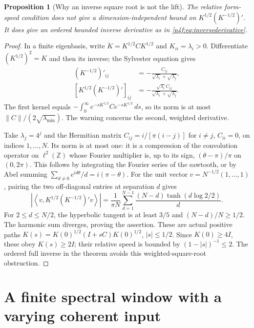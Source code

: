 \documentclass[11pt]{article}
\numberwithin{equation}{section}
\newtheorem{proposition}[theorem]{Proposition}
\theoremstyle{definition}
\theoremstyle{remark}
\begin{document}
\begin{proposition}[Why an inverse square root is not the lift]
\label{p4f:prop:sqrtwarning}
The relative form-speed condition does not give a
dimension-independent bound on
$K^{1/2}(K^{-1/2})'$. It does give an ordered bounded
inverse derivative as in \eqref{p4f:eq:inversederivative}.
\end{proposition}
\begin{proof}
In a finite eigenbasis, write
$\dot K=K^{1/2}CK^{1/2}$ and $K_{ii}=\lambda_i>0$.
Differentiate $(K^{1/2})^2=K$ and then its inverse;
the Sylvester equation gives
\begin{align*}
 (K^{-1/2})'_{ij}
   &=-\frac{C_{ij}}{\sqrt{\lambda_i}+\sqrt{\lambda_j}},\\
 [K^{1/2}(K^{-1/2})']_{ij}
   &=-\frac{\sqrt{\lambda_i}C_{ij}}
                     {\sqrt{\lambda_i}+\sqrt{\lambda_j}}.
\end{align*}
The first kernel equals
$-\int_0^\infty e^{-sK^{1/2}}C e^{-sK^{1/2}}\,ds$,
so its norm is at most
$\|C\|/(2\sqrt{\lambda_{\min}})$. The warning concerns
the second, weighted derivative.

Take $\lambda_j=4^j$ and the Hermitian matrix
$C_{ij}=i/[\pi(i-j)]$ for $i\ne j$, $C_{ii}=0$,
on indices $1,\ldots,N$. Its norm is at most one:
it is a compression of the convolution operator on
$\ell^2(\mathbb Z)$ whose Fourier multiplier is,
up to its sign, $(\theta-\pi)/\pi$ on $(0,2\pi)$.
This follows by integrating the Fourier series of
the sawtooth, or by Abel summing
$\sum_{d\ne0}e^{id\theta}/d=i(\pi-\theta)$.
For the unit vector $v=N^{-1/2}(1,\ldots,1)$, pairing
the two off-diagonal entries at separation $d$ gives
\[
 \left|\left\langle v,
       K^{1/2}(K^{-1/2})'v\right\rangle\right|
 =\frac1{\pi N}\sum_{d=1}^{N-1}
       \frac{(N-d)\tanh(d\log2/2)}d .
\]
For $2\le d\le N/2$, the hyperbolic tangent is at
least $3/5$ and $(N-d)/N\ge1/2$. The harmonic sum
diverges, proving the assertion. These are actual
positive paths
$K(s)=K(0)^{1/2}(I+sC)K(0)^{1/2}$, $|s|\leq1/2$.
Since $K(0)\geq4I$, these obey $K(s)\geq2I$; their relative
speed is bounded by $(1-|s|)^{-1}\leq2$.
The ordered full inverse in the theorem avoids this
weighted-square-root obstruction.
\end{proof}

\section{A finite spectral window with a varying coherent input}
\label{p4f:sec:window}
\end{document}
